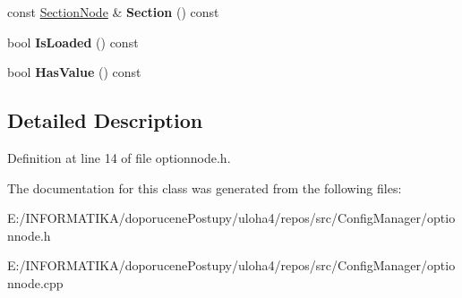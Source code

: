 \begin{DoxyCompactItemize}
\item 
const \hyperlink{class_config_manager_1_1_section_node}{Section\+Node} \& {\bfseries Section} () const \hypertarget{class_config_manager_1_1_option_node_a5f04016950d1b512d1b3efad7558da13}{}\label{class_config_manager_1_1_option_node_a5f04016950d1b512d1b3efad7558da13}

\item 
bool {\bfseries Is\+Loaded} () const \hypertarget{class_config_manager_1_1_option_node_a5c0a779da4931dab931cef2d9f9b1d70}{}\label{class_config_manager_1_1_option_node_a5c0a779da4931dab931cef2d9f9b1d70}

\item 
bool {\bfseries Has\+Value} () const \hypertarget{class_config_manager_1_1_option_node_acc9389da929330b79e78a8dcb6c66f11}{}\label{class_config_manager_1_1_option_node_acc9389da929330b79e78a8dcb6c66f11}

\end{DoxyCompactItemize}


\subsection{Detailed Description}


Definition at line 14 of file optionnode.\+h.



The documentation for this class was generated from the following files\+:\begin{DoxyCompactItemize}
\item 
E\+:/\+I\+N\+F\+O\+R\+M\+A\+T\+I\+K\+A/doporucene\+Postupy/uloha4/repos/src/\+Config\+Manager/optionnode.\+h\item 
E\+:/\+I\+N\+F\+O\+R\+M\+A\+T\+I\+K\+A/doporucene\+Postupy/uloha4/repos/src/\+Config\+Manager/optionnode.\+cpp\end{DoxyCompactItemize}

